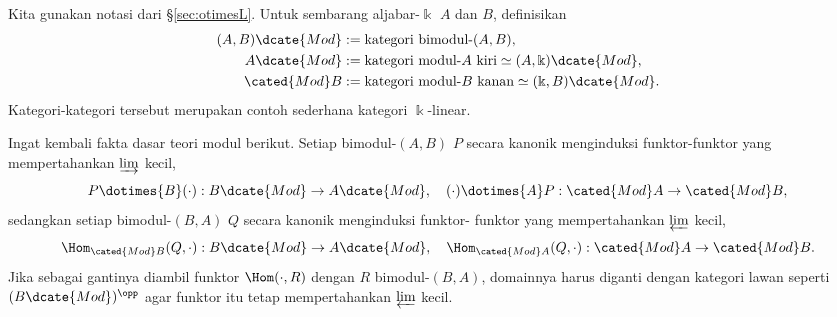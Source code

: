Kita gunakan notasi dari \S\ref{sec:otimesL}. Untuk sembarang aljabar-$\Bbbk$
$A$ dan $B$, definisikan
\begin{align*}
	(A, B)\dcate{Mod} & := \text{kategori bimodul-$(A,B)$}, \\
	A\dcate{Mod} & := \text{kategori modul-$A$ kiri} \simeq (A, \Bbbk)\dcate{Mod}, \\
	\cated{Mod}B & := \text{kategori modul-$B$ kanan} \simeq (\Bbbk, B)\dcate{Mod}.
\end{align*}
Kategori-kategori tersebut merupakan contoh sederhana kategori
$\Bbbk$-linear.

Ingat kembali fakta dasar teori modul berikut. Setiap bimodul-$(A,B)$ $P$
secara kanonik menginduksi funktor-funktor yang mempertahankan
$\varinjlim$ kecil,
\[ P \dotimes{B} (\cdot): B\dcate{Mod} \to A\dcate{Mod}, \quad (\cdot) \dotimes{A} P : \cated{Mod}A \to \cated{Mod}B, \]
sedangkan setiap bimodul-$(B,A)$ $Q$ secara kanonik menginduksi funktor-
funktor yang mempertahankan $\varprojlim$ kecil,
\[ \Hom_{\cated{Mod}B}(Q, \cdot): B\dcate{Mod} \to A\dcate{Mod}, \quad \Hom_{\cated{Mod}A}(Q, \cdot): \cated{Mod}A \to \cated{Mod}B. \]
Jika sebagai gantinya diambil funktor $\Hom(\mathord\cdot,R)$ dengan $R$
bimodul-$(B,A)$, domainnya harus diganti dengan kategori lawan seperti
$(B\dcate{Mod})^{\opp}$ agar funktor itu tetap mempertahankan
$\varprojlim$ kecil.

